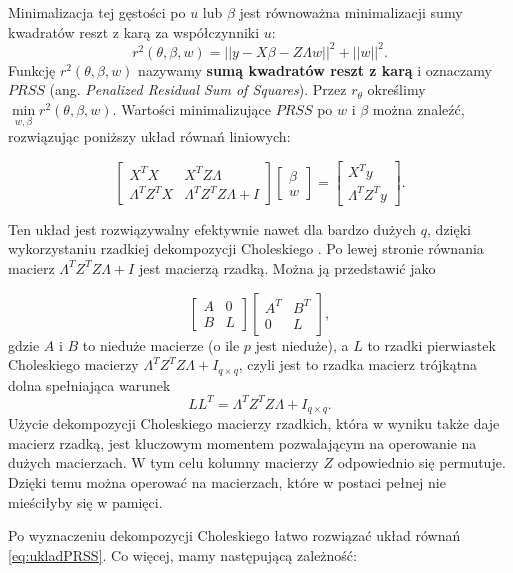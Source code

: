 \documentclass[12pt]{mwbk}
\theoremstyle{plain}
\theoremstyle{definition}
\theoremstyle{definition}
\begin{document}
Minimalizacja tej gęstości po $u$ lub $\beta$ jest równoważna minimalizacji sumy kwadratów reszt z karą za współczynniki $u$:
$$r^2(\theta, \beta, w)=||y-X\beta-Z\Lambda w||^2+||w||^2.$$ Funkcję $r^2(\theta, \beta, w)$ nazywamy \textbf{sumą kwadratów reszt z karą} i oznaczamy $PRSS$ (ang. \textit{Penalized Residual Sum of Squares}). Przez $r_{\theta}$ określimy $\min\limits_{w,\beta} r^2(\theta, \beta,w)$. Wartości minimalizujące $PRSS$ po $w$ i $\beta$ można znaleźć, rozwiązując poniższy układ równań liniowych:

\begin{equation} \label{eq:ukladPRSS}
\begin{bmatrix}
X^TX & X^TZ\Lambda \\
\Lambda^TZ^TX & \Lambda^TZ^TZ\Lambda +I
\end{bmatrix}
\begin{bmatrix}
\beta \\
w
\end{bmatrix}=
\begin{bmatrix}
X^Ty\\
\Lambda^TZ^Ty
\end{bmatrix}.
\end{equation}

Ten układ jest rozwiązywalny efektywnie nawet dla bardzo dużych $q$, dzięki wykorzystaniu rzadkiej dekompozycji Choleskiego \cite{cholesky}. Po lewej stronie równania macierz $\Lambda^TZ^TZ\Lambda+I$ jest macierzą rzadką. Można ją przedstawić jako

$$\begin{bmatrix}
A & 0 \\
B & L
\end{bmatrix}
\begin{bmatrix}
A^T & B^T\\
0 & L
\end{bmatrix},
$$
gdzie $A$ i $B$ to nieduże macierze (o ile $p$ jest nieduże), a $L$ to rzadki pierwiastek Choleskiego macierzy $\Lambda^TZ^TZ\Lambda+I_{q\times q}$, czyli jest to rzadka macierz trójkątna dolna spełniająca warunek $$LL^T=\Lambda^TZ^TZ\Lambda +I_{q \times q}.$$ Użycie dekompozycji Choleskiego macierzy rzadkich, która w wyniku także daje macierz rzadką, jest kluczowym momentem pozwalającym na operowanie na dużych macierzach. W tym celu kolumny macierzy $Z$ odpowiednio się permutuje. Dzięki temu można operować na macierzach, które w postaci pełnej nie mieściłyby się w pamięci.

Po wyznaczeniu dekompozycji Choleskiego łatwo rozwiązać układ równań \ref{eq:ukladPRSS}. Co więcej, mamy następującą zależność:
\end{document}
